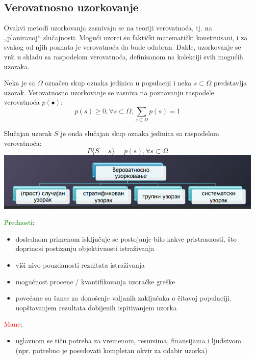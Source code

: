 \documentclass[10pt,a4paper,]{article}
\begin{document}
\subsection{Verovatnosno uzorkovanje}
Ovakvi metodi uzorkovanja zasnivaju se na teoriji verovatnoća, tj. na 
„planiranoj“ slučajnosti. Mogući uzorci su faktički matematički 
konstruisani, i za svakog od njih poznata je verovatnoća da bude 
odabran. Dakle, uzorkovanje se vrši u skladu sa raspodelom 
verovatnoća, definisanom na kolekciji svih mogućih uzoraka.

\textbullet Neka je sa $\Omega $ označen skup oznaka jedinica u populaciji 
i neka $s \subset \Omega $
predstavlja uzorak.
Verovatnosno uzorkovanje se zasniva na poznavanju raspodele verovatnoća $p(\bullet)$:
$$ p(s) \geq 0,	 \forall s \subset \Omega,
 \sum_{s \subset \Omega} p(s) = 1 $$

Slučajan uzorak $S$ je onda slučajan skup oznaka jedinica sa 
raspodelom verovatnoća:
$$P\{S=s\} = p(s), \forall s \subset \Omega$$
\includegraphics[scale=0.5]{primer6}

\textcolor{green}{Prednosti}:
\begin{itemize}
 
	\item doslednom primenom isključuje se postojanje bilo kakve 
	pristrasnosti, 
	što doprinosi postizanju objektivnosti istraživanja
	\item viši nivo pouzdanosti rezultata istraživanja
	\item mogućnost procene / kvantifikovanja uzoračke greške
	\item povećane su šanse za donošenje valjanih zaključaka o 
	čitavoj populaciji, uopštavanjem rezultata dobijenih ispitivanjem uzorka

\end{itemize}
\textcolor{red}{Mane}:
\begin{itemize}
	\item 
	uglavnom se tiču potreba za vremenom, resursima, finansijama i 
	ljudstvom (npr. potrebno je posedovati kompletan okvir za odabir 
	uzorka)

\end{itemize}
\end{document}
